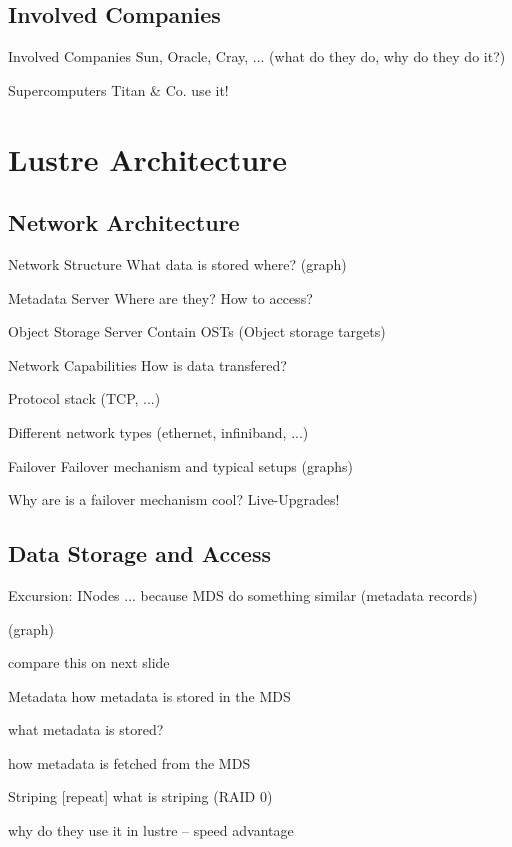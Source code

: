\documentclass[compress,t]{beamer}
\newcommand{\sectiontoc}{
    \begin{frame}{\textbf{\insertsectionhead}}
        \tableofcontents[current]
    \end{frame}

    \addtocounter{framenumber}{-1}%
}
\begin{document}
\subsection{Involved Companies}
\begin{frame}{Involved Companies}
    Sun, Oracle, Cray, ... (what do they do, why do they do it?)
\end{frame}
\begin{frame}{Supercomputers}
    Titan \& Co. use it!
\end{frame}


\section{Lustre Architecture}
\sectiontoc

\subsection{Network Architecture}
\begin{frame}{Network Structure}
    What data is stored where? (graph)
\end{frame}
\begin{frame}{Metadata Server}
    Where are they? How to access?
\end{frame}
\begin{frame}{Object Storage Server}
    Contain OSTs (Object storage targets)
\end{frame}
\begin{frame}{Network Capabilities}
    How is data transfered?

    Protocol stack (TCP, ...)

    Different network types (ethernet, infiniband, ...)
\end{frame}
\begin{frame}{Failover}
    Failover mechanism and typical setups (graphs)

    Why are is a failover mechanism cool? Live-Upgrades!
\end{frame}

\subsection{Data Storage and Access}
\begin{frame}{Excursion: INodes}
    ... because MDS do something similar (metadata records)

    (graph)

    compare this on next slide
\end{frame}
\begin{frame}{Metadata}
    how metadata is stored in the MDS

    what metadata is stored?

    how metadata is fetched from the MDS
\end{frame}
\begin{frame}{Striping}
    [repeat] what is striping (RAID 0)

    why do they use it in lustre -- speed advantage
\end{frame}
\end{document}
